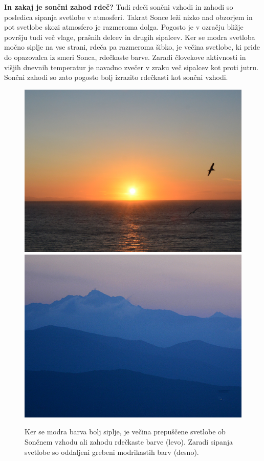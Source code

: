 \begin{example}{\bf In zakaj je sončni zahod rdeč?}
Tudi rdeči sončni vzhodi in zahodi so posledica sipanja svetlobe v atmosferi. 
Takrat Sonce leži nizko nad obzorjem in pot svetlobe skozi atmosfero je 
razmeroma dolga. Pogosto je v ozračju bližje površju tudi več vlage, prašnih delcev
in drugih sipalcev. Ker se modra svetloba močno siplje na vse strani, rdeča
pa razmeroma šibko, je večina svetlobe, ki pride do opazovalca iz smeri Sonca,
rdečkaste barve. Zaradi človekove aktivnosti in višjih dnevnih temperatur je 
navadno zvečer v zraku več sipalcev kot proti jutru. Sončni zahodi so zato pogosto
bolj izrazito rdečkasti kot sončni vzhodi.
\end{example}
\begin{figure}[!h]
\centering
\includegraphics[width=7truecm]{slike/07_Zahod.jpg}\hfill
\includegraphics[width=7truecm]{slike/07_Hribi.jpg}
\caption{Ker se modra barva bolj siplje, je večina prepuščene svetlobe ob Sončnem
vzhodu ali zahodu rdečkaste barve (levo). Zaradi sipanja svetlobe so oddaljeni
grebeni modrikastih barv (desno).}
\label{fig:07_Rdeca}
\end{figure}

